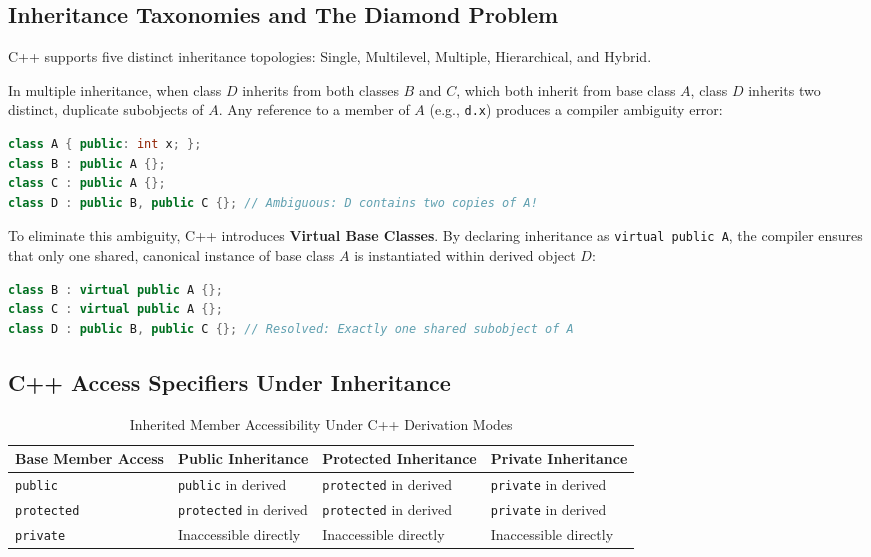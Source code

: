 \subsection{Inheritance Taxonomies and The Diamond Problem}
C++ supports five distinct inheritance topologies: Single, Multilevel, Multiple, Hierarchical, and Hybrid.

\begin{keyconcept}
In multiple inheritance, when class $D$ inherits from both classes $B$ and $C$, which both inherit from base class $A$, class $D$ inherits two distinct, duplicate subobjects of $A$. Any reference to a member of $A$ (e.g., \texttt{d.x}) produces a compiler ambiguity error:
\begin{lstlisting}[language=C++]
class A { public: int x; };
class B : public A {};
class C : public A {};
class D : public B, public C {}; // Ambiguous: D contains two copies of A!
\end{lstlisting}
To eliminate this ambiguity, C++ introduces \textbf{Virtual Base Classes}. By declaring inheritance as \texttt{virtual public A}, the compiler ensures that only one shared, canonical instance of base class $A$ is instantiated within derived object $D$:
\begin{lstlisting}[language=C++]
class B : virtual public A {};
class C : virtual public A {};
class D : public B, public C {}; // Resolved: Exactly one shared subobject of A
\end{lstlisting}
\end{keyconcept}

\subsection{C++ Access Specifiers Under Inheritance}
\begin{table}[htbp]
\centering
\small
\begin{tabularx}{\textwidth}{l X X X}
\toprule
\textbf{Base Member Access} & \textbf{Public Inheritance} & \textbf{Protected Inheritance} & \textbf{Private Inheritance} \\
\midrule
\texttt{public} & \texttt{public} in derived & \texttt{protected} in derived & \texttt{private} in derived \\
\texttt{protected} & \texttt{protected} in derived & \texttt{protected} in derived & \texttt{private} in derived \\
\texttt{private} & Inaccessible directly & Inaccessible directly & Inaccessible directly \\
\bottomrule
\end{tabularx}
\caption{Inherited Member Accessibility Under C++ Derivation Modes}
\label{tab:inheritance_access_modes}
\end{table}

